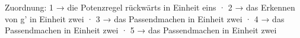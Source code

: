 
Zuordnung: 1 → die Potenzregel rückwärts in Einheit eins · 2 → das Erkennen von g' in Einheit zwei · 3 → das Passendmachen in Einheit zwei · 4 → das Passendmachen in Einheit zwei · 5 → das Passendmachen in Einheit zwei

